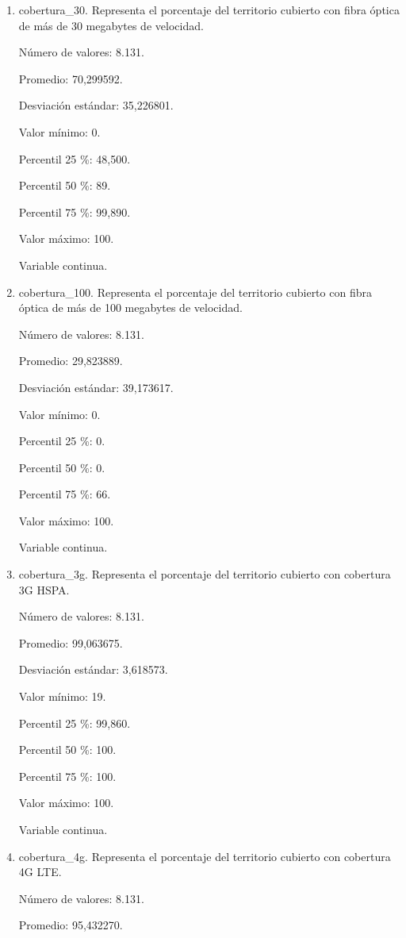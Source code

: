 \begin{enumerate}
	\item cobertura\_30. Representa el porcentaje del territorio cubierto con fibra óptica de más de 30 megabytes de velocidad.
	
	Número de valores: 8.131.
	
	Promedio: 70,299592.
	
	Desviación estándar: 35,226801.
	
	Valor mínimo: 0.
	
	Percentil 25 \%: 48,500.
	
	Percentil 50 \%: 89.
	
	Percentil 75 \%: 99,890.
	
	Valor máximo: 100.
	
	Variable continua.

	\item cobertura\_100. Representa el porcentaje del territorio cubierto con fibra óptica de más de 100 megabytes de velocidad.
	
	Número de valores: 8.131.
	
	Promedio: 29,823889.
	
	Desviación estándar: 39,173617.
	
	Valor mínimo: 0.
	
	Percentil 25 \%: 0.
	
	Percentil 50 \%: 0.
	
	Percentil 75 \%: 66.
	
	Valor máximo: 100.
	
	Variable continua.

	\item cobertura\_3g. Representa el porcentaje del territorio cubierto con cobertura 3G HSPA.
	
	Número de valores: 8.131.
	
	Promedio: 99,063675.
	
	Desviación estándar: 3,618573.
	
	Valor mínimo: 19.
	
	Percentil 25 \%: 99,860.
	
	Percentil 50 \%: 100.
	
	Percentil 75 \%: 100.
	
	Valor máximo: 100.
	
	Variable continua.

	\item cobertura\_4g. Representa el porcentaje del territorio cubierto con cobertura 4G LTE.
	
	Número de valores: 8.131.
	
	Promedio: 95,432270.
	

\end{enumerate}
